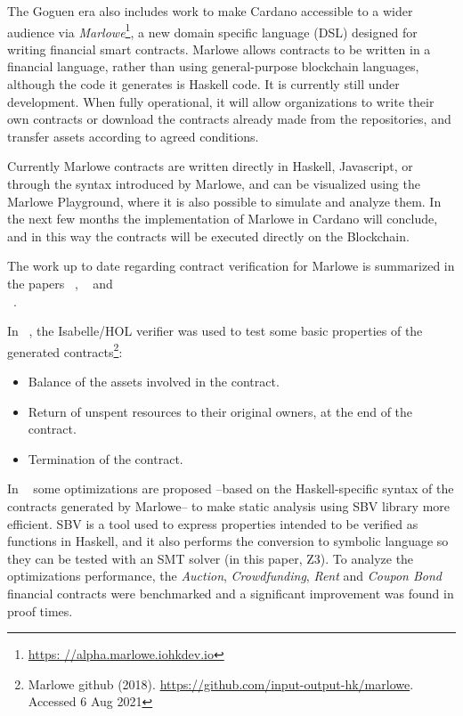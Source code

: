 \documentclass[12pt]{book}
\begin{document}
The Goguen era also includes work to make Cardano accessible to a wider audience via \textit{Marlowe}\footnote{\href{https://alpha.marlowe.iohkdev.io}{https: //alpha.marlowe.iohkdev.io}}, a new domain specific language (DSL) designed for writing financial smart contracts. Marlowe allows contracts to be written in a financial language, rather than using general-purpose blockchain languages, although the code it generates is Haskell code. It is currently still under development. When fully operational, it will allow organizations to write their own contracts or download the contracts already made from the repositories, and transfer assets according to agreed conditions.

Currently Marlowe contracts are written directly in Haskell, Javascript, or through the syntax introduced by Marlowe, and can be visualized using the Marlowe Playground, where it is also possible to simulate and analyze them. In the next few months the implementation of Marlowe in Cardano will conclude, and 
in this way the contracts will be executed directly on the Blockchain.


The work up to date regarding contract verification for Marlowe is summarized in the papers ~\cite {10.1007/978-3-030-03427-6_27}, ~\cite{10.1007/978-3-030-54455-3_35} and\\ ~\cite{10.1007/978-3-030-61467-6_11}.


In ~\cite{10.1007/978-3-030-54455-3_35}, the Isabelle/HOL verifier was used to test some basic properties of the generated contracts\footnote{Marlowe github (2018). \href{https://github.com/input-output-hk/marlowe}{https://github.com/input-output-hk/marlowe}. Accessed 6 Aug 2021}:

\begin{itemize}
     \item Balance of the assets involved in the contract.
     \item Return of unspent resources to their original owners, at the end of the contract.
     \item Termination of the contract.
\end{itemize}

In ~\cite{10.1007/978-3-030-61467-6_11} some optimizations are proposed --based on the Haskell-specific syntax of the contracts generated by Marlowe-- to make static analysis using SBV library more efficient. SBV is a tool used to express properties intended to be verified as functions in Haskell, and it also performs the conversion to symbolic language so they can be tested with an SMT solver (in this paper, Z3). To analyze the optimizations performance, the \textit{Auction}, \textit {Crowdfunding}, \textit{Rent} and \textit{Coupon Bond} financial contracts were benchmarked and a significant improvement was found in proof times.
\end{document}
